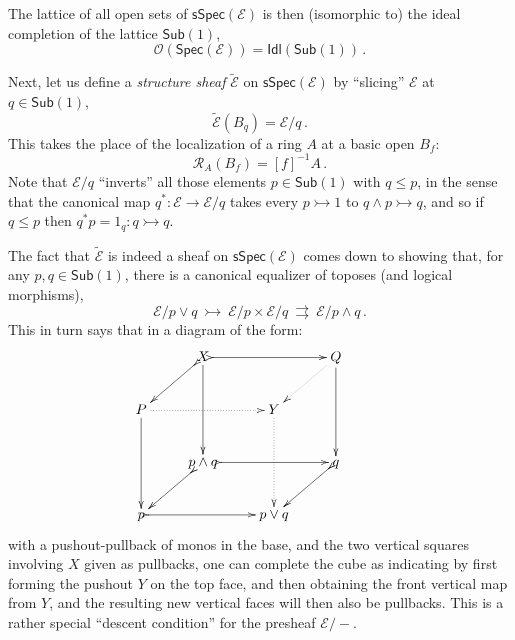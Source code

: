 \documentclass[graybox]{svmult}
\newcommand{\EE}{\ensuremath{\mathcal{E}}}
\newcommand{\mono}{\ensuremath{\rightarrowtail}}
\begin{document}
The lattice of all open sets of $\mathsf{sSpec}(\EE)$ is then (isomorphic to) the ideal completion of the lattice $\mathsf{Sub}(1)$,
$$\mathcal{O}(\mathsf{Spec}(\EE)) = \mathsf{Idl}(\mathsf{Sub}(1))\,.$$

%



Next, let us define a \emph{structure sheaf} $\widetilde{\EE}$ on $\mathsf{sSpec}(\EE)$ by ``slicing'' $\EE$ at $q \in\mathsf{Sub}(1)$,
\[
\widetilde{\EE}(B_q) = \EE/q\,.
\]
This takes the place of the localization of a ring $A$ at a basic open $B_f$:
\[
\mathcal{R}_A(B_f) = [f]^{-1}A\,.
\]
Note that $\EE/q$ ``inverts'' all those elements $p\in \mathsf{Sub}(1)$ with $q\leq p$, in the sense that the canonical map 
$q^* : \EE \to \EE/q$ takes every $p \mono 1$ to $q\wedge p \mono q$, and so if $q\leq p$ then $q^*p = 1_q : q \mono q$.

The fact that $\widetilde{\EE}$ is indeed a sheaf on $\mathsf{sSpec}(\EE)$ comes down to showing that, for any $p, q \in \mathsf{Sub}(1)$, there is a canonical equalizer of toposes (and logical morphisms),
\[
\EE/p\vee q\ \mono\ \EE/p \times \EE/q\ \rightrightarrows\ \EE/p\wedge q \,.
\]
This in turn says that in a diagram of the form: 
 \[ 
 \xymatrix{ 
& X \ar@{>->}[ld] \ar[dd] \ar@{>->}[rr] && Q \ar@{.>}[ld] \ar[dd] & \\
 P \ar[dd] \ar@{.>}[rr] && Y \ar@{.>}[dd]\\ 
 & p \wedge q \ar@{>->}[ld] \ar@{>->}[rr] && q \ar@{>->}[ld] & \\
  p \ar@{>->}[rr] && p\vee q} 
 \] 
 with a pushout-pullback of monos in the base, and the two vertical squares involving $X$ given as pullbacks, one can complete the cube as indicating by first forming the pushout $Y$ on the top face, and then obtaining the front vertical map from $Y$, and the resulting new vertical faces will then also be pullbacks. This is a rather special ``descent condition'' for the presheaf $\EE/-$.
 
\end{document}
